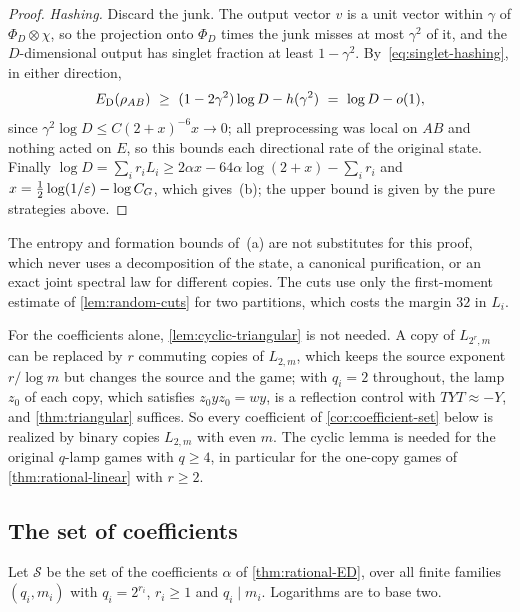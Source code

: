 \begin{proof}
\emph{Hashing.} Discard the junk. The output vector $v$ is a unit vector within $\gamma$ of $\Phi_D\otimes\chi$, so the projection onto
$\Phi_D$ times the junk misses at most $\gamma^2$ of it, and the $D$-dimensional output has singlet fraction at least $1-\gamma^2$.
By~\eqref{eq:singlet-hashing}, in either direction,
\[
\ED(\rho_{AB})\ \ge\ (1-2\gamma^2)\log D-h(\gamma^2)\ =\ \log D-o(1),
\]
since $\gamma^2\log D\le C(2+x)^{-6}x\to0$; all preprocessing was local on $AB$ and nothing acted on $E$, so this bounds each directional
rate of the original state. Finally $\log D=\sum_ir_iL_i\ge2\alpha x-64\alpha\log(2+x)-\sum_ir_i$ and $x=\frac12\log(1/\varepsilon)-\log C_G$, which
gives~(b); the upper bound is given by the pure strategies above.
\end{proof}

The entropy and formation bounds of~(a) are not substitutes for this proof, which never uses a decomposition of the state, a canonical
purification, or an exact joint spectral law for different copies. The cuts use only the first-moment estimate of \cref{lem:random-cuts}
for two partitions, which costs the margin $32$ in $L_i$.

\begin{remark}\label{rem:binary-route}
For the coefficients alone, \cref{lem:cyclic-triangular} is not needed. A copy of $L_{2^r,m}$ can be replaced by $r$ commuting copies of
$L_{2,m}$, which keeps the source exponent $r/\log m$ but changes the source and the game; with $q_i=2$ throughout, the lamp $z_0$ of each
copy, which satisfies $z_0yz_0=wy$, is a reflection control with $TYT\approx-Y$, and \cref{thm:triangular} suffices. So every coefficient of
\cref{cor:coefficient-set} below is realized by binary copies $L_{2,m}$ with even $m$. The cyclic lemma is needed for the original
$q$-lamp games with $q\ge4$, in particular for the one-copy games of \cref{thm:rational-linear} with $r\ge2$.
\end{remark}

\subsection{The set of coefficients}\label{sec:coefficient-set}

Let $\mathcal S$ be the set of the coefficients $\alpha$ of \cref{thm:rational-ED}, over all finite families $(q_i,m_i)$ with $q_i=2^{r_i}$,
$r_i\ge1$ and $q_i\mid m_i$. Logarithms are to base two.

